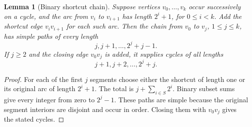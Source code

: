 \documentclass[11pt,a4paper]{article}
\numberwithin{equation}{section}
\newtheorem{lemma}[theorem]{Lemma}
\theoremstyle{definition}
\theoremstyle{remark}
\begin{document}
\begin{lemma}[Binary shortcut chain]\label{lem:binary-chain}
Suppose vertices $v_0,\ldots,v_k$ occur successively on a cycle, and the arc from $v_i$ to $v_{i+1}$ has length $2^i+1$, for $0\le i<k$. Add the shortcut edge $v_iv_{i+1}$ for each such arc. Then the chain from $v_0$ to $v_j$, $1\le j\le k$, has simple paths of every length
\[
 j,j+1,\ldots,2^j+j-1.
\]
If $j\ge2$ and the closing edge $v_0v_j$ is added, it supplies cycles of all lengths
\[
 j+1,j+2,\ldots,2^j+j.
\]
\end{lemma}
\begin{proof}
For each of the first $j$ segments choose either the shortcut of length one or its original arc of length $2^i+1$. The total is $j+\sum_{i\in S}2^i$. Binary subset sums give every integer from zero to $2^j-1$. These paths are simple because the original segment interiors are disjoint and occur in order. Closing them with $v_0v_j$ gives the stated cycles.
\end{proof}
\end{document}
